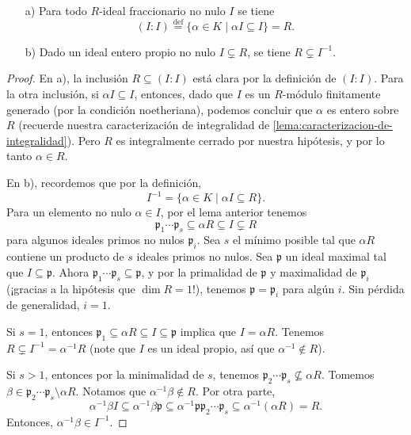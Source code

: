 \begin{lema}
  \begin{enumerate}
  \item[a)] Para todo $R$-ideal fraccionario no nulo $I$ se tiene
    \[ (I : I) \stackrel{\text{def}}{=}
           \{ \alpha \in K \mid \alpha I \subseteq I \} = R. \]
           
  \item[b)] Dado un ideal entero propio no nulo $I \subsetneq R$, se tiene
    $R \subsetneq I^{-1}$.
  \end{enumerate}

  \begin{proof}
    En a), la inclusión $R \subseteq (I : I)$ está clara por la definición de
    $(I : I)$. Para la otra inclusión, si $\alpha I \subseteq I$, entonces, dado
    que $I$ es un $R$-módulo finitamente generado (por la condición
    noetheriana), podemos concluir que $\alpha$ es entero sobre $R$ (recuerde
    nuestra caracterización de integralidad de
    \ref{lema:caracterizacion-de-integralidad}). Pero $R$ es integralmente
    cerrado por nuestra hipótesis, y por lo tanto $\alpha \in R$.

    En b), recordemos que por la definición,
    $$I^{-1} = \{ \alpha \in K \mid \alpha I \subseteq R \}.$$
    Para un elemento no nulo $\alpha \in I$, por el lema anterior tenemos
    \[ \mathfrak{p}_1\cdots\mathfrak{p}_s \subseteq \alpha R
           \subseteq I \subsetneq R \]
    para algunos ideales primos no nulos $\mathfrak{p}_i$. Sea $s$ el mínimo
    posible tal que $\alpha R$ contiene un producto de $s$ ideales primos no
    nulos. Sea $\mathfrak{p}$ un ideal maximal tal que
    $I \subseteq \mathfrak{p}$. Ahora
    $\mathfrak{p}_1\cdots\mathfrak{p}_s \subseteq \mathfrak{p}$,
    y por la primalidad de $\mathfrak{p}$ y maximalidad de $\mathfrak{p}_i$
    (¡gracias a la hipótesis que $\dim R = 1$!), tenemos
    $\mathfrak{p} = \mathfrak{p}_i$ para algún $i$. Sin pérdida de generalidad,
    $i = 1$.

    Si $s = 1$, entonces
    $\mathfrak{p}_1 \subseteq \alpha R \subseteq I \subseteq \mathfrak{p}$
    implica que $I = \alpha R$. Tenemos $R \subsetneq I^{-1} = \alpha^{-1} R$
    (note que $I$ es un ideal propio, así que $\alpha^{-1} \notin R$).

    Si $s > 1$, entonces por la minimalidad de $s$, tenemos
    $\mathfrak{p}_2\cdots\mathfrak{p}_s \not\subseteq \alpha R$. Tomemos
    $\beta \in \mathfrak{p}_2\cdots\mathfrak{p}_s \setminus \alpha R$.
    Notamos que $\alpha^{-1}\beta \notin R$. Por otra parte,
    \[ \alpha^{-1}\beta I \subseteq \alpha^{-1}\beta\mathfrak{p}
       \subseteq \alpha^{-1} \mathfrak{p}\mathfrak{p}_2\cdots\mathfrak{p}_s
       \subseteq \alpha^{-1} (\alpha R) = R. \]
    Entonces, $\alpha^{-1}\beta \in I^{-1}$.
  \end{proof}
\end{lema}

